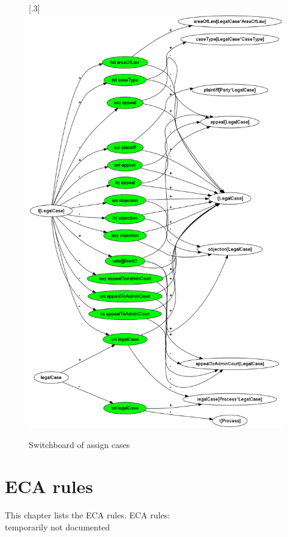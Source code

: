 \documentclass[10pt,a4paper]{report}              %
\theoremstyle{plain}\theorembodyfont{\rmfamily}\newtheorem{definition}{Definition}[section]
\theoremstyle{plain}\theorembodyfont{\rmfamily}\newtheorem{designrule}[definition]{Requirement}
\begin{document}
\begin{figure}[htb]
\begin{center}
\scalebox{.3}[.3]{\includegraphics{SBassign_cases}}
\caption{Switchboard of assign cases}
\label{fig:SBassign_cases}
\end{center}
\end{figure}
\chapter{ECA rules}\label{chpECA}

This chapter lists the ECA rules.
ECA rules:\\   temporarily not documented
\end{document}
